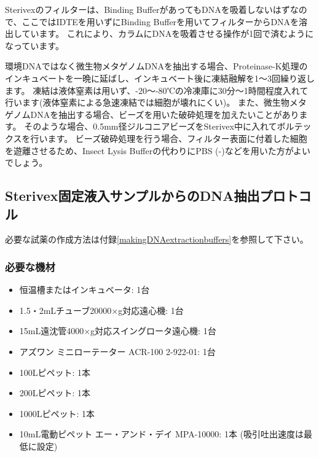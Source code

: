 \documentclass[titlepage,10pt,a4paper,uplatex]{jsbook}
\begin{document}
Sterivexのフィルターは、Binding BufferがあってもDNAを吸着しないはずなので、ここではIDTEを用いずにBinding Bufferを用いてフィルターからDNAを溶出しています。
これにより、カラムにDNAを吸着させる操作が1回で済むようになっています。

環境DNAではなく微生物メタゲノムDNAを抽出する場合、Proteinase-K処理のインキュベートを一晩に延ばし、インキュベート後に凍結融解を1～3回繰り返します。
凍結は液体窒素は用いず、{-20}～{-80}℃の冷凍庫に30分～1時間程度入れて行います(液体窒素による急速凍結では細胞が壊れにくい)。
また、微生物メタゲノムDNAを抽出する場合、ビーズを用いた破砕処理を加えたいことがあります。
そのような場合、0.5mm径ジルコニアビーズをSterivex中に入れてボルテックスを行います\citep{Ushio2019}。
ビーズ破砕処理を行う場合、フィルター表面に付着した細胞を遊離させるため、Insect Lysis Bufferの代わりにPBS (-)などを用いた方がよいでしょう。

\subsection{Sterivex固定液入サンプルからのDNA抽出プロトコル}

必要な試薬の作成方法は付録\ref{makingDNAextractionbuffers}を参照して下さい。

\subsubsection{必要な機材}
\begin{itemize}
\item 恒温槽またはインキュベータ: 1台
\item 1.5・2mLチューブ20000×g対応遠心機: 1台
\item 15mL遠沈管4000×g対応スイングロータ遠心機: 1台
\item アズワン ミニローテーター ACR-100 2-922-01: 1台
\item 100{\textmu}Lピペット: 1本
\item 200{\textmu}Lピペット: 1本
\item 1000{\textmu}Lピペット: 1本
\item 10mL電動ピペット エー・アンド・デイ MPA-10000: 1本 (吸引吐出速度は最低に設定)
\end{itemize}
\end{document}
